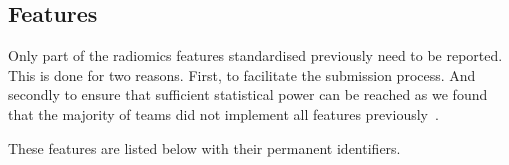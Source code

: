 \documentclass[fleqn,a4paper,oneside,openany]{book}
\begin{document}



%
\subsection{Features}\label{sec:radiomicsfeaturesbenchmarking}
%
Only part of the radiomics features standardised previously need to be reported. This is done for two reasons. First, to facilitate the submission process. And secondly to ensure that sufficient statistical power can be reached as we found that the majority of teams did not implement all features previously~\cite{Zwanenburg2020-jt}.

These features are listed below with their permanent identifiers.
\end{document}

